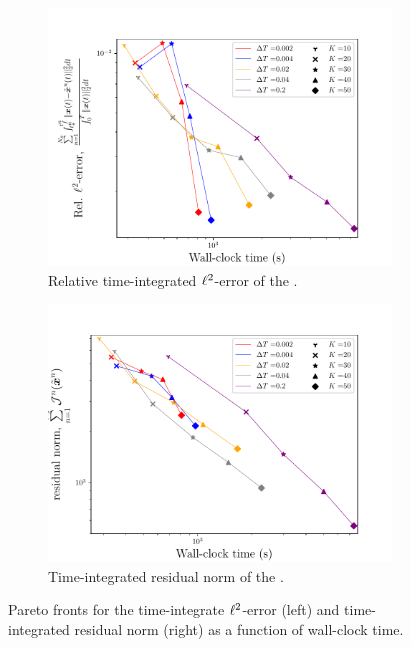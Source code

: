 \begin{figure}
\begin{center}
\begin{subfigure}[t]{0.45\textwidth}
\includegraphics[width=1.\linewidth]{figs/sod/pareto_error.pdf}
\caption{Relative time-integrated $\ell^2$-error of the \methodAcronymROM.}
\label{fig:sod_error_converge_pareto}
\end{subfigure}
\begin{subfigure}[t]{0.45\textwidth}
\includegraphics[width=1.\linewidth]{figs/sod/pareto_resids.pdf}
\caption{Time-integrated residual norm of the \methodAcronymROM.} 
\label{fig:sod_residual_converge_pareto}
\end{subfigure}
\caption{Pareto fronts for the time-integrate $\ell^2$-error (left) and time-integrated residual norm (right) as a function of wall-clock time.} 
\label{fig:convergence_study_pareto}
\end{center}
\end{figure}

